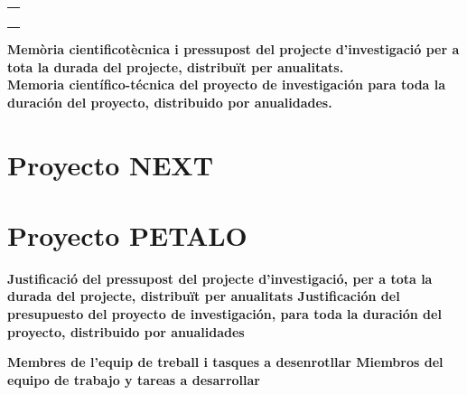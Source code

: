 \documentclass[a4paper,11pt,oneside]{article}
\begin{document}
\newpage

\begin{tcolorbox}[breakable,colback=white,coltitle=black,arc=0pt,outer arc=0pt,colframe=black,boxrule=0.6pt,boxsep=0pt,left=0pt,top=0pt,right=0pt]

\begin{tabularx}{\textwidth}{X}
\\
\\
\\
\\
\\
\hline
\end{tabularx}



{\bf
Mem\`oria cientificot\`ecnica i pressupost del projecte d’investigació per a tota la durada del projecte, distribu\"it per anualitats. \\ Memoria cient\'ifico-t\'ecnica del proyecto de investigaci\'on para toda la duraci\'on del proyecto, distribuido por anualidades.
}


\section*{Proyecto NEXT}



\section*{Proyecto PETALO}



\end{tcolorbox}

\newpage

\begin{tcolorbox}[breakable,colback=white,coltitle=black,arc=0pt,outer arc=0pt,colframe=black,boxrule=0.6pt,boxsep=0pt,left=0pt,top=0pt,right=0pt]
{\bf
Justificació del pressupost del projecte d’investigació, per a tota la durada del projecte, distribuït per anualitats
Justificación del presupuesto del proyecto de investigación, para toda la duración del proyecto, distribuido por anualidades
}



\end{tcolorbox}

\newpage

\begin{tcolorbox}[breakable,colback=white,coltitle=black,arc=0pt,outer
  arc=0pt,colframe=black,boxrule=0.6pt,boxsep=0pt,left=0pt,top=0pt,right=0pt]

{\bf Membres de l'equip de treball i tasques a desenrotllar 
Miembros del equipo de trabajo y tareas  a desarrollar }



\end{tcolorbox}
\end{document}
